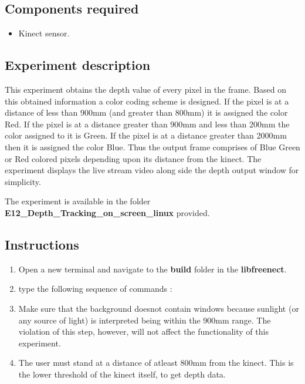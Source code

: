 \begin{flushleft}
\subsection{\textbf{ Components required}}
\begin{itemize}
\item Kinect sensor.
 \end{itemize}
\medskip

\subsection{\textbf{ Experiment description}}
This experiment obtains the depth value of every pixel in the frame. Based on this obtained information a color coding scheme is designed. If the pixel is at a distance of less than 900mm (and greater than 800mm) it is assigned the color Red. If the pixel is at a distance greater than 900mm and less than 200mm the color assigned to it is Green. If the pixel is at a distance greater than 2000mm then it is assigned the color Blue. Thus the output frame comprises of Blue Green or Red colored pixels depending upon its distance from the kinect.
The experiment displays the live stream video along side the depth output window for simplicity.


\medskip
The experiment is available in the folder \textbf{E12\_Depth\_Tracking\_on\_screen\_linux} provided.
\medskip

\subsection{\textbf{ Instructions}}
\begin{enumerate}

\item Open a new terminal and navigate to the \textbf{build} folder in the \textbf{libfreenect}.
\item type the following sequence of commands :
\item Make sure that the background doesnot contain windows because sunlight (or any source of light) is interpreted being within the 900mm range. The violation of this step, however, will not affect the functionality of this experiment.
\item The user must stand at a distance of atleast 800mm from the kinect. This is the lower threshold of the kinect itself, to get depth data.



\end{enumerate}
\end{flushleft}

